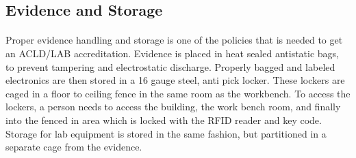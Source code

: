 \documentclass{article}
\begin{document}
\subsection{Evidence and Storage}
\paragraph{}
Proper evidence handling and storage is one of the policies that is needed to get an ACLD/LAB accreditation.
Evidence is placed in heat sealed antistatic bags, to prevent tampering and electrostatic discharge.
Properly bagged and labeled electronics are then stored in a 16 gauge steel, anti pick locker.
These lockers are caged in a floor to ceiling fence in the same room as the workbench.  
To access the lockers, a person needs to access the building, the work bench room, and finally into the fenced in area which is locked with the RFID reader and key code.
Storage for lab equipment is stored in the same fashion, but partitioned in a separate cage from the evidence.
\end{document}
